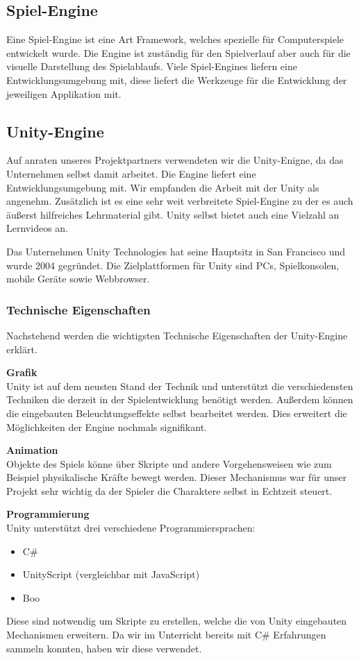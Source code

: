 \subsection{Spiel-Engine}
Eine Spiel-Engine ist eine Art Framework, welches spezielle für Computerspiele entwickelt wurde. Die Engine ist zuständig für den Spielverlauf aber auch für die visuelle Darstellung des Spielablaufs. Viele Spiel-Engines liefern eine Entwicklungsumgebung mit, diese liefert die Werkzeuge für die Entwicklung der jeweiligen Applikation mit. \cite{Spiel-Engine}

\subsection{Unity-Engine}
Auf anraten unseres Projektpartners verwendeten wir die Unity-Enigne, da das Unternehmen selbst damit arbeitet. Die Engine liefert eine Entwicklungsumgebung mit. Wir empfanden die Arbeit mit der Unity als angenehm. Zusätzlich ist es eine sehr weit verbreitete Spiel-Engine zu der es auch äußerst hilfreiches Lehrmaterial gibt. Unity selbst bietet auch eine Vielzahl an Lernvideos an.

Das Unternehmen Unity Technologies hat seine Hauptsitz in San Francisco und wurde 2004 gegründet. Die Zielplattformen für Unity sind PCs, Spielkonsolen, mobile Geräte sowie Webbrowser. \cite{Unity-Engine}

\subsubsection{Technische Eigenschaften}
Nachstehend werden die wichtigsten Technische Eigenschaften der Unity-Engine erklärt. 

\textbf{Grafik}\\
Unity ist auf dem neusten Stand der Technik und unterstützt die verschiedensten Techniken die derzeit in der Spielentwicklung benötigt werden. Außerdem können die eingebauten Beleuchtungseffekte selbst bearbeitet werden. Dies erweitert die Möglichkeiten der Engine nochmals signifikant.

\textbf{Animation}\\
Objekte des Spiels könne über Skripte und andere Vorgehensweisen wie zum Beispiel physikalische Kräfte bewegt werden. Dieser Mechanismus war für unser Projekt sehr wichtig da der Spieler die Charaktere selbst in Echtzeit steuert. 

\textbf{Programmierung}\\
Unity unterstützt drei verschiedene Programmiersprachen:
\begin{itemize}
	\item C\#
	\item UnityScript (vergleichbar mit JavaScript)
	\item Boo
\end{itemize}
Diese sind notwendig um Skripte zu erstellen, welche die von Unity eingebauten Mechanismen erweitern. Da wir im Unterricht bereits mit C\# Erfahrungen sammeln konnten, haben wir diese verwendet.

